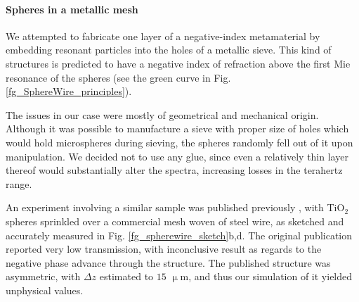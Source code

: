 \paragraph{Spheres in a metallic mesh} %
We attempted to fabricate one layer of a negative-index metamaterial by embedding resonant particles into the holes of a metallic sieve. This kind of structures is predicted to have a negative index of refraction above the first Mie resonance of the spheres (see the green curve in Fig. \ref{fg_SphereWire_principles}). 

The issues in our case were mostly of geometrical and mechanical origin. Although it was possible to manufacture a sieve with proper size of holes which would hold microspheres during sieving, the spheres randomly fell out of it upon manipulation. We decided not to use any glue, since even a relatively thin layer thereof would substantially alter the spectra, increasing losses in the terahertz range.

An experiment involving a similar sample was published previously \cite{yakiyama2012terahertz}, with TiO$_{2}$ spheres sprinkled over a commercial mesh woven of steel wire, as sketched and accurately measured in Fig. \ref{fg_spherewire_sketch}b,d. The original publication reported very low transmission, with inconclusive result as regards to the negative phase advance through the structure. The published structure was asymmetric, with $\Delta z$ estimated to $15$ $\upmu$m, and thus our simulation of it yielded unphysical values.

%    



